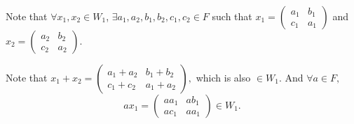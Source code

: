 \documentclass[12pt]{article}%
\begin{document}
Note that $\forall x_1,x_2\in W_1$, $\exists a_1, a_2, b_1, b_2, c_1, c_2 \in F$ such that $x_1=\begin{pmatrix}
                                                                                        a_1 & b_1
                                                                                        \\c_1 & a_1
                                                                                        \end{pmatrix}$ and $x_2=\begin{pmatrix}
                                                                                                                    a_2 & b_2
                                                                                                                    \\c_2 & a_2
                                                                                                                    \end{pmatrix}$.

Note that $x_1+x_2=\begin{pmatrix}
                    a_1+ a_2 & b_1+b_2
                    \\c_1+c_2 & a_1+a_2
                    \end{pmatrix},$ which is also $\in W_1.$ And $\forall a \in F,$ $$ax_1=\begin{pmatrix}
                                                                                        aa_1 & ab_1
                                                                                        \\ac_1 & aa_1
                                                                                        \end{pmatrix} \in W_1.$$
\end{document}
